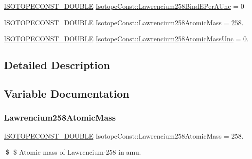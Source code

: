 \begin{DoxyCompactItemize}
\mbox{\hyperlink{group___isotope_const-_macros_ga8f45a7272ce02c0b4c65c44636ed719a}{I\+S\+O\+T\+O\+P\+E\+C\+O\+N\+S\+T\+\_\+\+D\+O\+U\+B\+LE}} \mbox{\hyperlink{group___isotope_const-_lawrencium-_lr258_ga9839213329583ca9faf3177425526295}{Isotope\+Const\+::\+Lawrencium258\+Bind\+E\+Per\+A\+Unc}} = 0
\item 
\mbox{\hyperlink{group___isotope_const-_macros_ga8f45a7272ce02c0b4c65c44636ed719a}{I\+S\+O\+T\+O\+P\+E\+C\+O\+N\+S\+T\+\_\+\+D\+O\+U\+B\+LE}} \mbox{\hyperlink{group___isotope_const-_lawrencium-_lr258_ga30a30e6dad17fcc0c16a9a04e35976ad}{Isotope\+Const\+::\+Lawrencium258\+Atomic\+Mass}} = 258.
\item 
\mbox{\hyperlink{group___isotope_const-_macros_ga8f45a7272ce02c0b4c65c44636ed719a}{I\+S\+O\+T\+O\+P\+E\+C\+O\+N\+S\+T\+\_\+\+D\+O\+U\+B\+LE}} \mbox{\hyperlink{group___isotope_const-_lawrencium-_lr258_gafb00da3c860c7fa62c4815fa5c92cc38}{Isotope\+Const\+::\+Lawrencium258\+Atomic\+Mass\+Unc}} = 0.
\end{DoxyCompactItemize}


\subsection{Detailed Description}


\subsection{Variable Documentation}
\mbox{\label{group___isotope_const-_lawrencium-_lr258_ga30a30e6dad17fcc0c16a9a04e35976ad}} 
\subsubsection{\texorpdfstring{Lawrencium258\+Atomic\+Mass}{Lawrencium258AtomicMass}}
{\footnotesize\ttfamily \mbox{\hyperlink{group___isotope_const-_macros_ga8f45a7272ce02c0b4c65c44636ed719a}{I\+S\+O\+T\+O\+P\+E\+C\+O\+N\+S\+T\+\_\+\+D\+O\+U\+B\+LE}} Isotope\+Const\+::\+Lawrencium258\+Atomic\+Mass = 258.}

\$ \$ Atomic mass of Lawrencium-\/258 in amu. \mbox{\label{group___isotope_const-_lawrencium-_lr258_gafb00da3c860c7fa62c4815fa5c92cc38}} 
